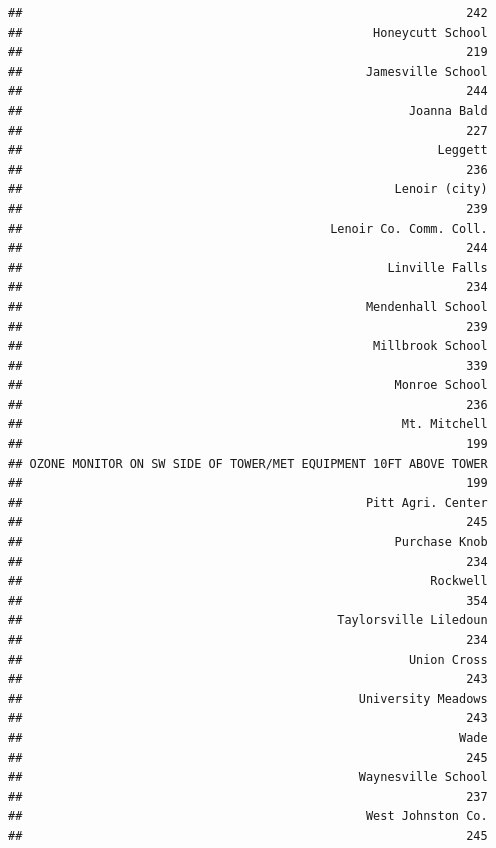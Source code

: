 \documentclass[12pt,]{article}
\begin{document}
\begin{verbatim}
##                                                              242 
##                                                 Honeycutt School 
##                                                              219 
##                                                Jamesville School 
##                                                              244 
##                                                      Joanna Bald 
##                                                              227 
##                                                          Leggett 
##                                                              236 
##                                                    Lenoir (city) 
##                                                              239 
##                                           Lenoir Co. Comm. Coll. 
##                                                              244 
##                                                   Linville Falls 
##                                                              234 
##                                                Mendenhall School 
##                                                              239 
##                                                 Millbrook School 
##                                                              339 
##                                                    Monroe School 
##                                                              236 
##                                                     Mt. Mitchell 
##                                                              199 
## OZONE MONITOR ON SW SIDE OF TOWER/MET EQUIPMENT 10FT ABOVE TOWER 
##                                                              199 
##                                                Pitt Agri. Center 
##                                                              245 
##                                                    Purchase Knob 
##                                                              234 
##                                                         Rockwell 
##                                                              354 
##                                            Taylorsville Liledoun 
##                                                              234 
##                                                      Union Cross 
##                                                              243 
##                                               University Meadows 
##                                                              243 
##                                                             Wade 
##                                                              245 
##                                               Waynesville School 
##                                                              237 
##                                                West Johnston Co. 
##                                                              245
\end{verbatim}
\end{document}
